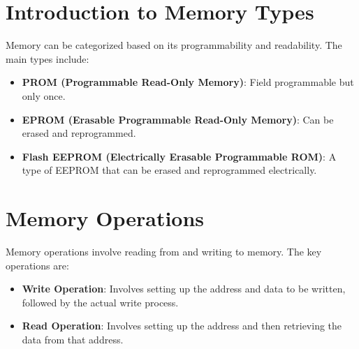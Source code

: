 \documentclass{article}
\begin{document}
\section{Introduction to Memory Types}
Memory can be categorized based on its programmability and readability. The main types include:
\begin{itemize}
    \item \textbf{PROM (Programmable Read-Only Memory)}: Field programmable but only once.
    \item \textbf{EPROM (Erasable Programmable Read-Only Memory)}: Can be erased and reprogrammed.
    \item \textbf{Flash EEPROM (Electrically Erasable Programmable ROM)}: A type of EEPROM that can be erased and reprogrammed electrically.
\end{itemize}

\section{Memory Operations}
Memory operations involve reading from and writing to memory. The key operations are:
\begin{itemize}
    \item \textbf{Write Operation}: Involves setting up the address and data to be written, followed by the actual write process.
    \item \textbf{Read Operation}: Involves setting up the address and then retrieving the data from that address.
\end{itemize}
\end{document}
